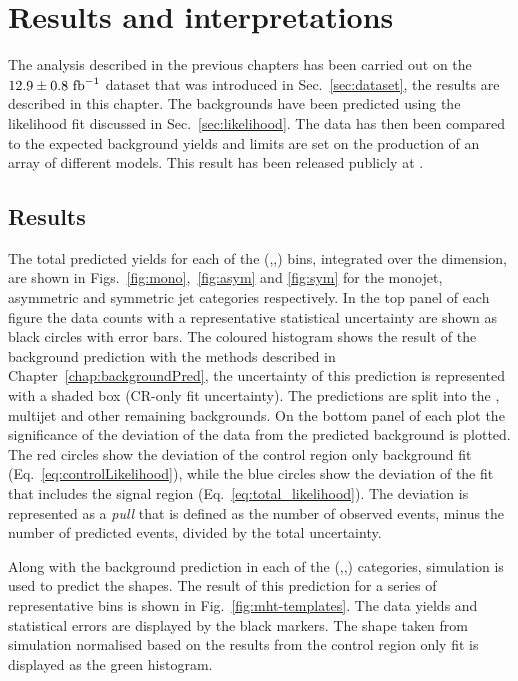 \chapter{Results and interpretations}
\label{chap:results}

The analysis described in the previous chapters has been carried out
on the $12.9\pm0.8~\text{fb}^{-1}$ dataset that was introduced in
Sec.~\ref{sec:dataset}, the results are described in this chapter. The
\SM backgrounds have been predicted using the likelihood fit discussed
in Sec.~\ref{sec:likelihood}. The data has then been compared to the expected
background yields and limits are set on the production of an array of
different \SUSY models. This result has been released publicly
at \cite{CMS-PAS-SUS-16-016}.

\section{Results}

The total predicted \SM yields for each of the (\HT,\nj,\nb) bins,
integrated over the \MHT dimension, are shown in
Figs.~\ref{fig:mono},~\ref{fig:asym} and \ref{fig:sym} for the
monojet, asymmetric and symmetric jet categories respectively. In the
top panel of each figure the data counts with a representative
statistical uncertainty are shown as black circles with error bars.
The coloured histogram shows the result of the \SM background
prediction with the \TF methods described in
Chapter~\ref{chap:backgroundPred}, the uncertainty of this prediction
is represented with a shaded box (CR-only fit uncertainty). The
predictions are split into the \znunu, \QCD multijet and other
remaining \SM backgrounds. On the bottom panel of each plot the
significance of the deviation of the data from the predicted \SM
background is plotted. The red circles show the deviation of the
control region only background fit (Eq.~\ref{eq:controlLikelihood}),
while the blue circles show the deviation of the fit that includes the
signal region (Eq.~\ref{eq:total_likelihood}). The deviation is
represented as a \emph{pull} that is defined as the number of observed
events, minus the number of predicted events, divided by the total
uncertainty.

Along with the background prediction in each of the (\HT,\nj,\nb)
categories, simulation is used to predict the \MHT shapes. The result
of this prediction for a series of representative bins is shown in
Fig.~\ref{fig:mht-templates}. The data yields and statistical errors
are displayed by the black markers. The \MHT shape taken from
simulation normalised based on the results from the control region
only fit is displayed as the green histogram.

